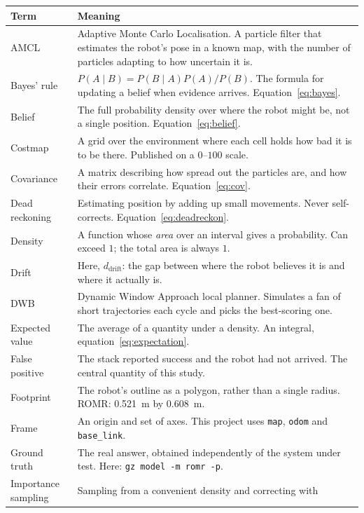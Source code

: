 \documentclass[11pt,a4paper]{report}
\newcommand{\file}[1]{\texttt{\small #1}}
\begin{document}
\begin{longtable}{@{}p{}p{}@{}}
\toprule
\textbf{Term} & \textbf{Meaning} \\
\midrule
\endhead
AMCL & Adaptive Monte Carlo Localisation. A particle filter that estimates the
  robot's pose in a known map, with the number of particles adapting to how
  uncertain it is. \\
Bayes' rule & $P(A\mid B) = P(B\mid A)P(A)/P(B)$. The formula for updating a
  belief when evidence arrives. Equation~\eqref{eq:bayes}. \\
Belief & The full probability density over where the robot might be, not a
  single position. Equation~\eqref{eq:belief}. \\
Costmap & A grid over the environment where each cell holds how bad it is to be
  there. Published on a $0$--$100$ scale. \\
Covariance & A matrix describing how spread out the particles are, and how
  their errors correlate. Equation~\eqref{eq:cov}. \\
Dead reckoning & Estimating position by adding up small movements. Never
  self-corrects. Equation~\eqref{eq:deadreckon}. \\
Density & A function whose \emph{area} over an interval gives a probability.
  Can exceed $1$; the total area is always $1$. \\
Drift & Here, $d_{\text{drift}}$: the gap between where the robot believes it
  is and where it actually is. \\
DWB & Dynamic Window Approach local planner. Simulates a fan of short
  trajectories each cycle and picks the best-scoring one. \\
Expected value & The average of a quantity under a density. An integral,
  equation~\eqref{eq:expectation}. \\
False positive & The stack reported success and the robot had not arrived. The
  central quantity of this study. \\
Footprint & The robot's outline as a polygon, rather than a single radius.
  ROMR: \SI{0.521}{\metre} by \SI{0.608}{\metre}. \\
Frame & An origin and set of axes. This project uses \file{map}, \file{odom}
  and \file{base\_link}. \\
Ground truth & The real answer, obtained independently of the system under
  test. Here: \file{gz model -m romr -p}. \\
Importance sampling & Sampling from a convenient density and correcting with

\end{longtable}
\end{document}
